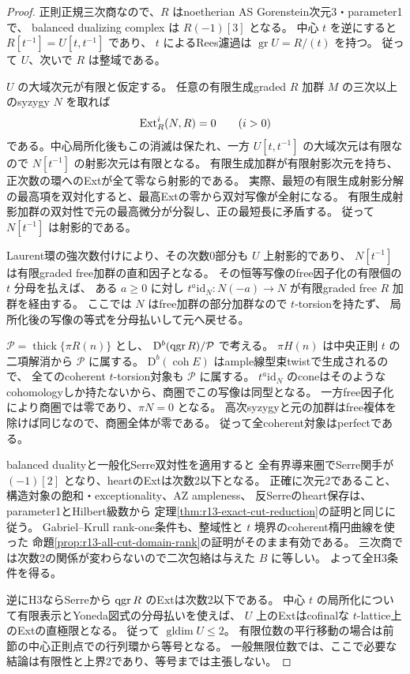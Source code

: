 \begin{proof}
正則正規三次商なので、$R$ はnoetherian AS Gorenstein次元3・parameter1で、
balanced dualizing complex は $R(-1)[3]$ となる。
中心 $t$ を逆にすると $R[t^{-1}]=U[t,t^{-1}]$ であり、
$t$ によるRees濾過は $\operatorname{gr}U=R/(t)$ を持つ。
従って $U$、次いで $R$ は整域である。

$U$ の大域次元が有限と仮定する。
任意の有限生成graded $R$ 加群 $M$ の三次以上のsyzygy $N$ を取れば
\[
 \operatorname{Ext}_R^i(N,R)=0\qquad(i>0)
\]
である。中心局所化後もこの消滅は保たれ、一方
$U[t,t^{-1}]$ の大域次元は有限なので $N[t^{-1}]$ の射影次元は有限となる。
有限生成加群が有限射影次元を持ち、正次数の環へのExtが全て零なら射影的である。
実際、最短の有限生成射影分解の最高項を双対化すると、最高Extの零から双対写像が全射になる。
有限生成射影加群の双対性で元の最高微分が分裂し、正の最短長に矛盾する。
従って $N[t^{-1}]$ は射影的である。

Laurent環の強次数付けにより、その次数0部分も $U$ 上射影的であり、
$N[t^{-1}]$ は有限graded free加群の直和因子となる。
その恒等写像のfree因子化の有限個の $t$ 分母を払えば、
ある $a\ge0$ に対し $t^a\mathrm{id}_N:N(-a)\to N$ が有限graded free $R$ 加群を経由する。
ここでは $N$ はfree加群の部分加群なので $t$-torsionを持たず、
局所化後の写像の等式を分母払いして元へ戻せる。

$\mathcal P=\operatorname{thick}\{\pi R(n)\}$ とし、
$\mathrm D^b(\operatorname{qgr} R)/\mathcal P$ で考える。
$\pi H(n)$ は中央正則 $t$ の二項解消から $\mathcal P$ に属する。
$\mathrm D^b(\operatorname{coh}E)$ はample線型束twistで生成されるので、
全てのcoherent $t$-torsion対象も $\mathcal P$ に属する。
$t^a\mathrm{id}_N$ のconeはそのようなcohomologyしか持たないから、商圏でこの写像は同型となる。
一方free因子化により商圏では零であり、$\pi N=0$ となる。
高次syzygyと元の加群はfree複体を除けば同じなので、商圏全体が零である。
従って全coherent対象はperfectである。

balanced dualityと一般化Serre双対性\cite{YZ,ChenCut}を適用すると
全有界導来圏でSerre関手が $(-1)[2]$ となり、heartのExtは次数2以下となる。
正確に次元2であること、構造対象の飽和・exceptionality、AZ ampleness、
反Serreのheart保存は、parameter1とHilbert級数から
定理\ref{thm:r13-exact-cut-reduction}の証明と同じに従う。
Gabriel--Krull rank-one条件も、整域性と $t$ 境界のcoherent楕円曲線を使った
命題\ref{prop:r13-all-cut-domain-rank}の証明がそのまま有効である。
三次商では次数2の関係が変わらないので二次包絡は与えた $B$ に等しい。
よって全H3条件を得る。

逆にH3ならSerreから $\operatorname{qgr} R$ のExtは次数2以下である。
中心 $t$ の局所化について有限表示とYoneda図式の分母払いを使えば、
$U$ 上のExtはcofinalな $t$-lattice上のExtの直極限となる。
従って $\operatorname{gldim}U\le2$。
有限位数の平行移動の場合は前節の中心正則点での行列環から等号となる。
一般無限位数では、ここで必要な結論は有限性と上界2であり、等号までは主張しない。
\end{proof}

